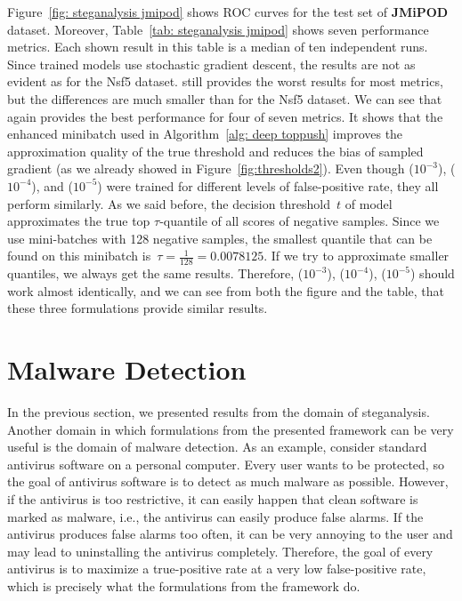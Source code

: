 Figure~\ref{fig: steganalysis jmipod} shows ROC curves for the test set of \textbf{JMiPOD} dataset. Moreover, Table~\ref{tab: steganalysis jmipod} shows seven performance metrics. Each shown result in this table is a median of ten independent runs. Since trained models use stochastic gradient descent, the results are not as evident as for the Nsf5 dataset. \BaseLine still provides the worst results for most metrics, but the differences are much smaller than for the Nsf5 dataset. We can see that \DeepTopPush again provides the best performance for four of seven metrics. It shows that the enhanced minibatch used in \DeepTopPush Algorithm~\ref{alg: deep toppush} improves the approximation quality of the true threshold and reduces the bias of sampled gradient (as we already showed in Figure~\ref{fig:thresholds2}). Even though \PatMatNP($10^{-3}$), \PatMatNP($10^{-4}$), and \PatMatNP($10^{-5}$) were trained for different levels of false-positive rate, they all perform similarly. As we said before, the decision threshold~$t$ of \PatMatNP model approximates the true top $\tau$-quantile of all scores of negative samples. Since we use mini-batches with 128 negative samples, the smallest quantile that can be found on this minibatch is~$\tau = \frac{1}{128}=0.0078125.$ If we try to approximate smaller quantiles, we always get the same results. Therefore, \PatMatNP($10^{-3}$), \PatMatNP($10^{-4}$), \PatMatNP($10^{-5}$) should work almost identically, and we can see from both the figure and the table, that these three formulations provide similar results.

\section{Malware Detection}\label{sec: malware detection}

In the previous section, we presented results from the domain of steganalysis. Another domain in which formulations from the presented framework can be very useful is the domain of malware detection. As an example, consider standard antivirus software on a personal computer. Every user wants to be protected, so the goal of antivirus software is to detect as much malware as possible. However, if the antivirus is too restrictive, it can easily happen that clean software is marked as malware, i.e., the antivirus can easily produce false alarms. If the antivirus produces false alarms too often, it can be very annoying to the user and may lead to uninstalling the antivirus completely. Therefore, the goal of every antivirus is to maximize a true-positive rate at a very low false-positive rate, which is precisely what the formulations from the framework do.

